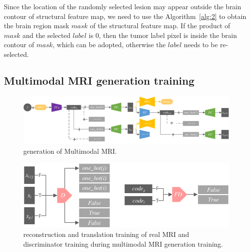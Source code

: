 \documentclass[letterpaper]{article} %
\begin{document}
Since the location of the randomly selected lesion may appear outside the brain contour of structural feature map, we need to use the Algorithm~\ref{alg:2} to obtain the brain region mask $mask$ of the structural feature map. If the product of $mask$ and the selected $label$ is 0, then the tumor label pixel is inside the brain contour of $mask$, which can be adopted, otherwise the $label$ needs to be re-selected.

\subsection{Multimodal MRI generation training}
\begin{figure}
	\centering
	\includegraphics[width=0.98\columnwidth]{figures/mm_mri_generate}
	\caption{generation of Multimodal MRI.}
	\label{mm_mri_generate}
\end{figure}

\begin{figure}
	\centering
	\includegraphics[width=0.8\columnwidth]{figures/D}
	\caption{reconstruction and translation training of real MRI and discriminator training during multimodal MRI generation training.}
	\label{train_D}
\end{figure}
\end{document}
